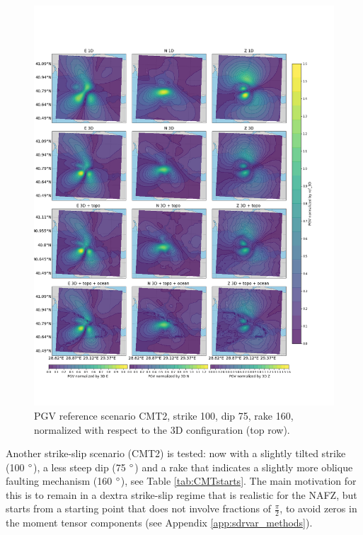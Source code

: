 \documentclass[../Text/00main.tex]{subfiles}
\begin{document}
\begin{figure}[htp!]
    \centering
    \includegraphics[width=1\linewidth, trim = 0cm 3.5cm 5.5cm 4cm, clip]{images_results/Ref_scenarios_normalized_sc2.png}
    \caption{PGV reference scenario CMT2, strike 100, dip 75, rake 160, normalized with respect to the 3D configuration (top row).}
    \label{fig:ref_CMT2}
\end{figure}

Another strike-slip scenario (CMT2) is tested: now with a slightly tilted strike (100 $\degree$), a less steep dip (75 $\degree$) and a rake that indicates a slightly more oblique faulting mechanism (160 $\degree$), see Table \ref{tab:CMTstarts}. The main motivation for this is to remain in a dextra strike-slip regime that is realistic for the NAFZ, but starts from a starting point that does not involve fractions of $\frac{\pi}{2}$, to avoid zeros in the moment tensor components (see Appendix \ref{app:sdrvar_methods}).
\end{document}
